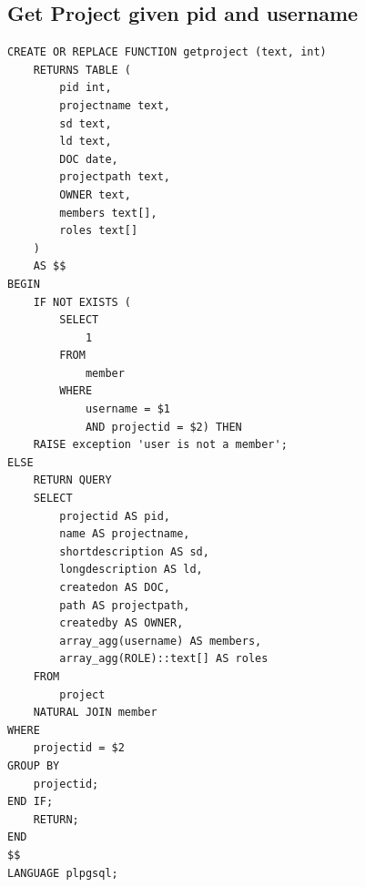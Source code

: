 \documentclass[conference,onecolumn]{IEEEtran}
\begin{document}
\subsection{Get Project given pid and username}
\begin{verbatim}
CREATE OR REPLACE FUNCTION getproject (text, int)
    RETURNS TABLE (
        pid int,
        projectname text,
        sd text,
        ld text,
        DOC date,
        projectpath text,
        OWNER text,
        members text[],
        roles text[]
    )
    AS $$
BEGIN
    IF NOT EXISTS (
        SELECT
            1
        FROM
            member
        WHERE
            username = $1
            AND projectid = $2) THEN
    RAISE exception 'user is not a member';
ELSE
    RETURN QUERY
    SELECT
        projectid AS pid,
        name AS projectname,
        shortdescription AS sd,
        longdescription AS ld,
        createdon AS DOC,
        path AS projectpath,
        createdby AS OWNER,
        array_agg(username) AS members,
        array_agg(ROLE)::text[] AS roles
    FROM
        project
    NATURAL JOIN member
WHERE
    projectid = $2
GROUP BY
    projectid;
END IF;
    RETURN;
END
$$
LANGUAGE plpgsql;
\end{verbatim}
\end{document}
